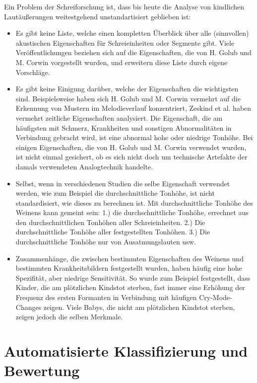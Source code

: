 Ein Problem der Schreiforschung ist, dass bis heute die Analyse von kindlichen Lautäußerungen weitestgehend unstandartisiert geblieben ist: \cite[S. 142]{signal}
\begin{itemize}
	\item Es gibt keine Liste, welche einen kompletten Überblick über alle (sinnvollen) akustischen Eigenschaften für Schreieinheiten oder Segmente gibt. Viele Veröffentlichungen beziehen sich auf die Eigenschaften, die von H. Golub und M. Corwin vorgestellt wurden, und erweitern diese Liste durch eigene Vorschläge. 
	\item Es gibt keine Einigung darüber, welche der Eigenschaften die wichtigsten sind. Beispielsweise haben sich H. Golub und M. Corwin \cite{cryModel} vermehrt auf die Erkennung von Mustern im Melodieverlauf konzentriert, Zeskind et al. \cite{rythmic} haben vermehrt zeitliche Eigenschaften analysiert. Die Eigenschaft, die am häufigsten mit Schmerz, Krankheiten und sonstigen Abnormalitäten in Verbindung gebracht wird, ist eine abnormal hohe oder niedrige Tonhöhe. Bei einigen Eigenschaften, die von H. Golub und M. Corwin verwendet wurden, ist nicht einmal gesichert, ob es sich nicht doch um technische Artefakte der damals verwendeten Analogtechnik handelte.\cite[S. 84 - 85]{parentalPerception}
	\item Selbst, wenn in verschiedenen Studien die selbe Eigenschaft verwendet werden, wie zum Beispiel die durchschnittliche Tonhöhe, ist nicht standardisiert, wie dieses zu berechnen ist. Mit \glqq durchschnittliche Tonhöhe des Weinens\grqq{} kann gemeint sein: 1.) die durchschnittliche Tonhöhe, errechnet aus den durchschnittlichen Tonhöhen aller Schreieinheiten. 2.) Die durchschnittliche Tonhöhe aller festgestellten Tonhöhen. 3.) Die durchschnittliche Tonhöhe nur von Ausatmungslauten usw.
	\item Zusammenhänge, die zwischen bestimmten Eigenschaften des Weinens und bestimmten Krankheitsbildern festgestellt wurden, haben häufig eine hohe Spezifität, aber niedrige Sensitivität. So wurde zum Beispiel festgestellt, dass Kinder, die am plötzlichen Kindstot sterben, fast immer eine Erhöhung der Frequenz des ersten Formanten in Verbindung mit häufigen Cry-Mode-Changes zeigen. Viele Babys, die nicht am plötzlichen Kindstot sterben, zeigen jedoch die selben Merkmale.\cite[S. 85]{parentalPerception}
\end{itemize}

\section{Automatisierte Klassifizierung und Bewertung}
\label{sec:learning}


